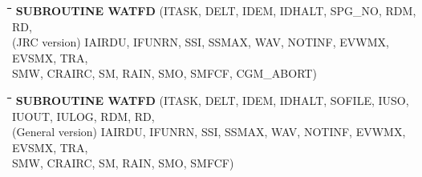 \documentclass[11pt]{article}
\begin{document}
\bigskip
\bigskip
\nwln
\begin{tabbing}
\hspace{1.27cm}\=\hspace{1.27cm}\=\hspace{1.27cm}\=\hspace{1.27cm}\=%
\hspace{1.27cm}\=\hspace{1.27cm}\=\hspace{1.27cm}\=\hspace{1.27cm}\=%
\hspace{1.27cm}\=\hspace{1.27cm}\=\kill
{\bf SUBROUTINE WATFD}\> \> \> (ITASK, DELT, IDEM, IDHALT, SPG\_NO, RDM, RD,\\
(JRC version) \> \> \>  IAIRDU, IFUNRN, SSI, SSMAX, WAV, NOTINF, EVWMX, EVSMX, TRA,\\
 \>\> \>  SMW, CRAIRC, SM, RAIN, SMO, SMFCF, CGM\_ABORT)
\end{tabbing}
\nwln
\begin{tabbing}
\hspace{1.27cm}\=\hspace{1.27cm}\=\hspace{1.27cm}\=\hspace{1.27cm}\=%
\hspace{1.27cm}\=\hspace{1.27cm}\=\hspace{1.27cm}\=\hspace{1.27cm}\=%
\hspace{1.27cm}\=\hspace{1.27cm}\=\kill
{\bf SUBROUTINE WATFD}\> \> \> (ITASK, DELT, IDEM, IDHALT, SOFILE, IUSO, IUOUT, IULOG, RDM, RD,\\
(General version) \> \> \> IAIRDU, IFUNRN, SSI, SSMAX, WAV, NOTINF, EVWMX, EVSMX, TRA,\\
 \>\> \>  SMW, CRAIRC, SM, RAIN, SMO, SMFCF)
\end{tabbing}
\nwln
\end{document}
